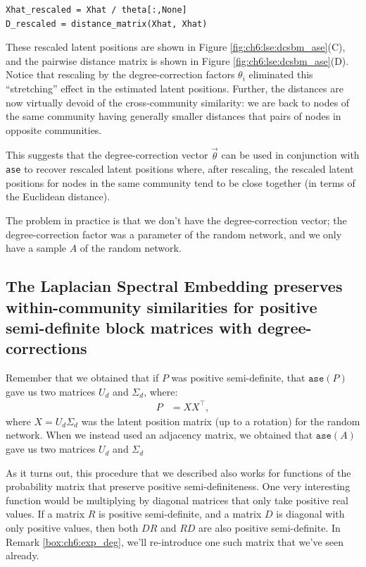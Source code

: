 \begin{lstlisting}[style=python]
Xhat_rescaled = Xhat / theta[:,None]
D_rescaled = distance_matrix(Xhat, Xhat)
\end{lstlisting}
These rescaled latent positions are shown in Figure \ref{fig:ch6:lse:dcsbm_ase}(C), and the pairwise distance matrix is shown in Figure \ref{fig:ch6:lse:dcsbm_ase}(D). Notice that rescaling by the degree-correction factors $\theta_i$ eliminated this ``stretching'' effect in the estimated latent positions. Further, the distances are now virtually devoid of the cross-community similarity: we are back to nodes of the same community having generally smaller distances that pairs of nodes in opposite communities.

This suggests that the degree-correction vector $\vec\theta$ can be used in conjunction with \texttt{ase} to recover rescaled latent positions where, after rescaling, the rescaled latent positions for nodes in the same community tend to be close together (in terms of the Euclidean distance).

The problem in practice is that we don't have the degree-correction vector; the degree-correction factor was a parameter of the random network, and we only have a sample $A$ of the random network.

\subsection{The Laplacian Spectral Embedding preserves within-community similarities for positive semi-definite block matrices with degree-corrections}

Remember that we obtained that if $P$ was positive semi-definite, that $\texttt{ase}(P)$ gave us two matrices $U_d$ and $\Sigma_d$, where:
\begin{align*}
    P &= XX^\top,
\end{align*}
where $X = U_d\Sigma_d$ was the latent position matrix (up to a rotation) for the random network. When we instead used an adjacency matrix, we obtained that $\texttt{ase}(A)$ gave us two matrices $U_d$ and $\Sigma_d$

As it turns out, this procedure that we described also works for functions of the probability matrix that preserve positive semi-definiteness. One very interesting function would be multiplying by diagonal matrices that only take positive real values. If a matrix $R$ is positive semi-definite, and a matrix $D$ is diagonal with only positive values, then both $DR$ and $RD$ are also positive semi-definite. In Remark \ref{box:ch6:exp_deg}, we'll re-introduce one such matrix that we've seen already.

